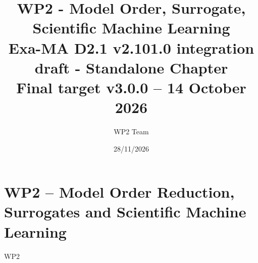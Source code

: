 \documentclass[11pt]{report}
\begin{document}
\title{WP2 - Model Order, Surrogate, Scientific Machine Learning\\
\large Exa-MA D2.1 v2.101.0 integration draft - Standalone Chapter\\
\normalsize Final target v3.0.0 -- 14 October 2026}
\author{WP2 Team}
\date{28/11/2026}
\maketitle

\tableofcontents
\clearpage

\chapter{WP2 -- Model Order Reduction, Surrogates and Scientific Machine Learning}
\label{chap:wp2}
{WP2}
\clearpage


\end{document}

